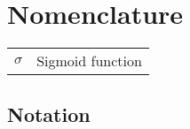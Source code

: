 \bgroup
\raggedbottom


\chapter*{Nomenclature}


\begin{tabular}{rl}
        $\sigma$      & Sigmoid function\\
\end{tabular}



\renewcommand{\listfigurename}{\Large List of Figures}
\disablenewpage{\listoffigures}

\renewcommand{\listtablename}{\Large List of Tables}
\disablenewpage{\listoftables}


\renewcommand{\listalgorithmname}{\Large List of Algorithms}
\disablenewpage{\listofalgorithms}

\section*{Notation}

